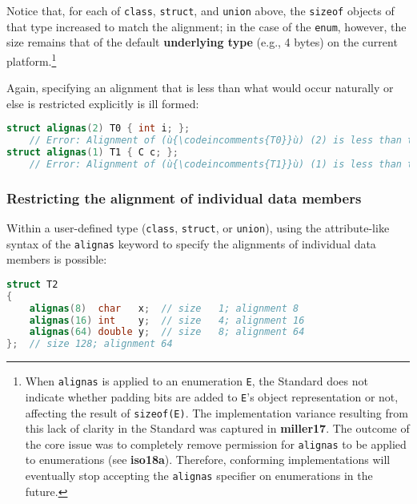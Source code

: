 \noindent Notice that, for each of \texttt{class}, \texttt{struct}, and
\texttt{union} above, the \texttt{sizeof} objects of that type increased
to match the alignment; in the case of the \texttt{enum}, however, the
size remains that of the default \textbf{underlying type} (e.g., 4
bytes) on the current platform.{\cprotect\footnote{When \texttt{alignas}
is applied to an enumeration \texttt{E}, the Standard does not
indicate whether padding bits are added to \texttt{E}'s object
representation or not, affecting the result of \texttt{sizeof(E)}. The
implementation variance resulting from this lack of clarity in the
  Standard was captured in \textbf{miller17}. The outcome of the core
  issue was to completely remove permission for \texttt{alignas} to be
  applied to enumerations (see \textbf{iso18a}). Therefore, conforming implementations will
  eventually stop accepting the \texttt{alignas} specifier on
  enumerations in the future.}}

Again, specifying an alignment that is less than what would occur
naturally or else is restricted explicitly is ill formed:

\begin{lstlisting}[language=C++]
struct alignas(2) T0 { int i; };  
    // Error: Alignment of (ù{\codeincomments{T0}}ù) (2) is less than that of (ù{\codeincomments{int}}ù) (4).
struct alignas(1) T1 { C c; };    
    // Error: Alignment of (ù{\codeincomments{T1}}ù) (1) is less than that of (ù{\codeincomments{C}}ù) (2).
\end{lstlisting}
    

\subsubsection[Restricting the alignment of individual data members]{Restricting the alignment of individual data members}\label{restricting-the-alignment-of-individual-data-members}

Within a user-defined type (\texttt{class}, \texttt{struct}, or
\texttt{union}), using the attribute-like syntax of the
\texttt{alignas} keyword to specify the alignments of individual data
members is possible:

\begin{lstlisting}[language=C++]
struct T2
{
    alignas(8)  char   x;  // size   1; alignment 8
    alignas(16) int    y;  // size   4; alignment 16
    alignas(64) double y;  // size   8; alignment 64
};  // size 128; alignment 64
\end{lstlisting}
    
